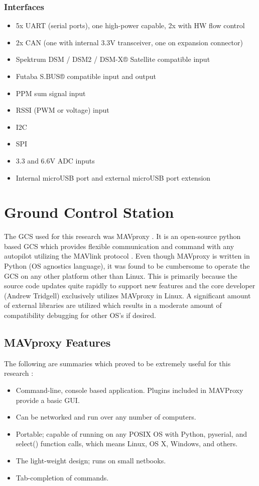 \subsubsection{Interfaces}
\begin{itemize}
\item 5x UART (serial ports), one high-power capable, 2x with HW flow control
\item 2x CAN (one with internal 3.3V transceiver, one on expansion connector)
\item Spektrum DSM / DSM2 / DSM-X® Satellite compatible input
\item Futaba S.BUS® compatible input and output
\item PPM sum signal input
\item RSSI (PWM or voltage) input
\item I2C
\item SPI
\item 3.3 and 6.6V ADC inputs
\item Internal microUSB port and external microUSB port extension
\end{itemize}

\section{Ground Control Station}

The \ac{GCS} used for this research was MAVproxy \cite{mavproxy}.  It is an open-source python based \ac{GCS} which provides flexible communication and command with any autopilot utilizing the MAVlink protocol \cite{mavlink}.  Even though MAVproxy is written in Python (\ac{OS} agnostics language), it was found to be cumbersome to operate the \ac{GCS} on any other platform other than Linux.  This is primarily because the source code updates quite rapidly to support new features and the core developer (Andrew Tridgell) exclusively utilizes MAVproxy in Linux.  A significant amount of external libraries are utilized which results in a moderate amount of compatibility debugging for other \ac{OS}'s if desired.

\subsection{MAVproxy Features}
The following are summaries which proved to be extremely useful for this research \cite{mavproxy_wiki}:
\begin{itemize}
\item Command-line, console based application. Plugins included in MAVProxy provide a basic \ac{GUI}.
\item Can be networked and run over any number of computers.
\item Portable; capable of running on any POSIX OS with Python, pyserial, and select() function calls, which means Linux, OS X, Windows, and others.
\item The light-weight design; runs on small netbooks.
\item Tab-completion of commands.
\end{itemize}

